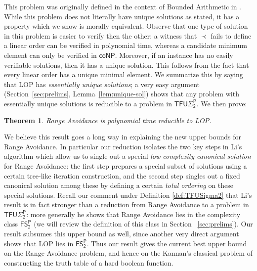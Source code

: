 \documentclass[11pt]{article}
\newtheorem{theorem}{Theorem}
\begin{document}
This problem was originally defined in the context of Bounded Arithmetic in \cite{Chiari1998-CHIWFI}. While this problem does not literally have unique solutions as stated, it has a property which we show is morally equivalent. Observe that one type of solution in this problem is easier to verify then the other: a witness that $\prec$ fails to define a linear order can be verified in polynomial time, whereas a candidate minimum element can only be verified in $\mathsf{coNP}$. Moreover, if an instance has no easily verifiable solutions, then it has a unique solution. This follows from the fact that every linear order has a unique minimal element. We summarize this by saying that LOP has \emph{essentially unique solutions}; a very easy argument (Section~\ref{sec:prelims}, Lemma~\ref{lem:unique-sol}) shows that any problem with essentially unique solutions is reducible to a problem in $\mathsf{TFU\Sigma_2^P}$. We then prove:

\begin{theorem}
\label{thm:avoid-to-lop-intro}
Range Avoidance is polynomial time reducible to LOP.
\end{theorem}

We believe this result goes a long way in explaining the new upper bounds for Range Avoidance. In particular our reduction isolates the two key steps in Li's algorithm which allow us to single out a special \emph{low complexity canonical solution} for Range Avoidance: the first step prepares a special subset of solutions using a certain tree-like iteration construction, and the second step singles out a fixed canonical solution among these by defining a certain \emph{total ordering} on these special solutions.  Recall our comment under Definition \ref{def:TFUSigma2} that Li's result is in fact stronger than a reduction from Range Avoidance to a problem in $\mathsf{TFU\Sigma_2^P}$: more generally he shows that Range Avoidance lies in the complexity class $\mathsf{FS_2^P}$ (we will review the definition of this class in Section ~\ref{sec:prelims}). Our result subsumes this upper bound as well, since another very direct argument shows that LOP lies in $\mathsf{FS_2^P}$. Thus our result gives the current best upper bound on the Range Avoidance problem, and hence on the Kannan's classical problem of constructing the truth table of a hard boolean function.
\end{document}
